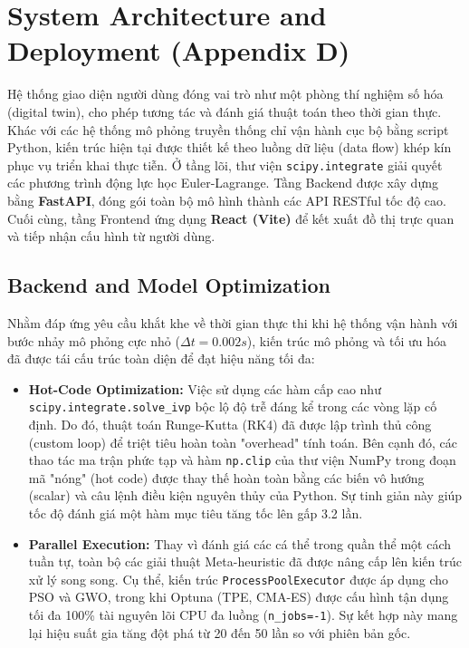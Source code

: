 \documentclass[conference, a4paper]{IEEEtran}
\begin{document}
\section{System Architecture and Deployment (Appendix D)}
Hệ thống giao diện người dùng đóng vai trò như một phòng thí nghiệm số hóa (digital twin), cho phép tương tác và đánh giá thuật toán theo thời gian thực. Khác với các hệ thống mô phỏng truyền thống chỉ vận hành cục bộ bằng script Python, kiến trúc hiện tại được thiết kế theo luồng dữ liệu (data flow) khép kín phục vụ triển khai thực tiễn. Ở tầng lõi, thư viện \texttt{scipy.integrate} giải quyết các phương trình động lực học Euler-Lagrange. Tầng Backend được xây dựng bằng \textbf{FastAPI}, đóng gói toàn bộ mô hình thành các API RESTful tốc độ cao. Cuối cùng, tầng Frontend ứng dụng \textbf{React (Vite)} để kết xuất đồ thị trực quan và tiếp nhận cấu hình từ người dùng.

\subsection{Backend and Model Optimization}
Nhằm đáp ứng yêu cầu khắt khe về thời gian thực thi khi hệ thống vận hành với bước nhảy mô phỏng cực nhỏ ($\Delta t = 0.002s$), kiến trúc mô phỏng và tối ưu hóa đã được tái cấu trúc toàn diện để đạt hiệu năng tối đa:
\begin{itemize}
    \item \textbf{Hot-Code Optimization:} Việc sử dụng các hàm cấp cao như \texttt{scipy.integrate.solve\_ivp} bộc lộ độ trễ đáng kể trong các vòng lặp cố định. Do đó, thuật toán Runge-Kutta (RK4) đã được lập trình thủ công (custom loop) để triệt tiêu hoàn toàn "overhead" tính toán. Bên cạnh đó, các thao tác ma trận phức tạp và hàm \texttt{np.clip} của thư viện NumPy trong đoạn mã "nóng" (hot code) được thay thế hoàn toàn bằng các biến vô hướng (scalar) và câu lệnh điều kiện nguyên thủy của Python. Sự tinh giản này giúp tốc độ đánh giá một hàm mục tiêu tăng tốc lên gấp 3.2 lần.
    \item \textbf{Parallel Execution:} Thay vì đánh giá các cá thể trong quần thể một cách tuần tự, toàn bộ các giải thuật Meta-heuristic đã được nâng cấp lên kiến trúc xử lý song song. Cụ thể, kiến trúc \texttt{ProcessPoolExecutor} được áp dụng cho PSO và GWO, trong khi Optuna (TPE, CMA-ES) được cấu hình tận dụng tối đa 100\% tài nguyên lõi CPU đa luồng (\texttt{n\_jobs=-1}). Sự kết hợp này mang lại hiệu suất gia tăng đột phá từ 20 đến 50 lần so với phiên bản gốc.
\end{itemize}
\end{document}
